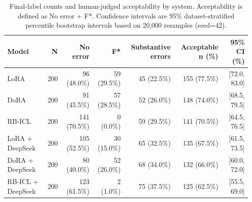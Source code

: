 \begin{table}[htbp]
\centering
\small
\begin{tabular}{lrrrrrr}
\toprule
Model & N & No error & F* & Substantive errors & Acceptable n (\%) & 95\% CI (\%) \\
\midrule
LoRA & 200 & 96 (48.0\%) & 59 (29.5\%) & 45 (22.5\%) & 155 (77.5\%) & [72.0, 83.0] \\
DoRA & 200 & 91 (45.5\%) & 57 (28.5\%) & 52 (26.0\%) & 148 (74.0\%) & [68.5, 79.5] \\
RB-ICL & 200 & 141 (70.5\%) & 0 (0.0\%) & 59 (29.5\%) & 141 (70.5\%) & [64.5, 76.5] \\
LoRA + DeepSeek & 200 & 105 (52.5\%) & 30 (15.0\%) & 65 (32.5\%) & 135 (67.5\%) & [61.5, 73.5] \\
DoRA + DeepSeek & 200 & 80 (40.0\%) & 52 (26.0\%) & 68 (34.0\%) & 132 (66.0\%) & [60.0, 72.0] \\
RB-ICL + DeepSeek & 200 & 123 (61.5\%) & 2 (1.0\%) & 75 (37.5\%) & 125 (62.5\%) & [55.5, 69.0] \\
\bottomrule
\end{tabular}
\caption{Final-label counts and human-judged acceptability by system. Acceptability is defined as No error + F*. Confidence intervals are 95\% dataset-stratified percentile bootstrap intervals based on 20,000 resamples (seed=42).}
\label{tab:substantive_error_rates}
\end{table}
